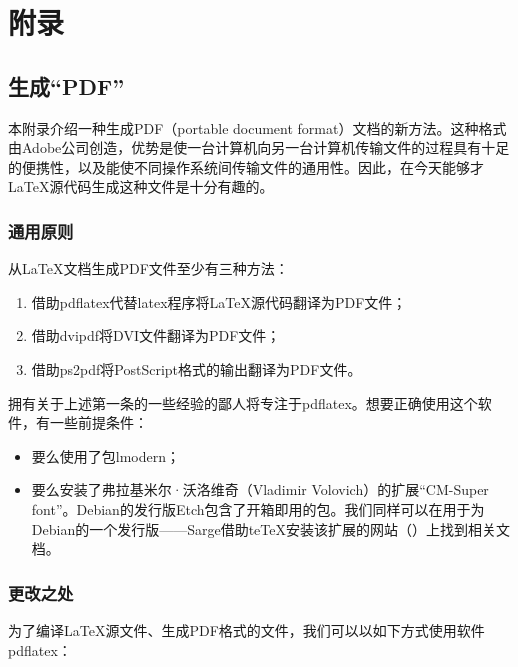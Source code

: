 \part{附录}
\appendix
\chapter{生成“PDF”}

本附录介绍一种生成PDF（portable document format）文档的新方法。这种格式由Adobe公司创造，优势是使一台计算机向另一台计算机传输文件的过程具有十足的便携性，以及能使不同操作系统间传输文件的通用性。因此，在今天能够才\LaTeX 源代码生成这种文件是十分有趣的。

\section{通用原则}

从\LaTeX 文档生成PDF文件至少有三种方法：

\begin{enumerate}
    \item 借助\textsf{pdflatex}代替\textsf{latex}程序将\LaTeX 源代码翻译为PDF文件；
    \item 借助\textsf{dvipdf}将DVI文件翻译为PDF文件；
    \item 借助\textsf{ps2pdf}将PostScript格式的输出翻译为PDF文件。
\end{enumerate}

\begin{exclamation}
拥有关于上述第一条的一些经验的鄙人将专注于pdflatex。想要正确使用这个软件，有一些前提条件：

\begin{itemize}
    \item 要么使用了包lmodern；
    \item 要么安装了弗拉基米尔·沃洛维奇（Vladimir Volovich）的扩展“CM-Super font”。Debian的发行版Etch包含了开箱即用的包。我们同样可以在用于为Debian的一个发行版——Sarge借助te\TeX 安装该扩展的网站（）上找到相关文档。
\end{itemize}
\end{exclamation}

\section{更改之处}

为了编译\LaTeX 源文件、生成PDF格式的文件，我们可以以如下方式使用软件\textsf{pdflatex}：

